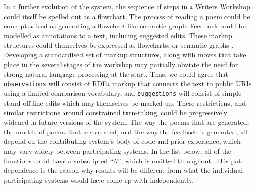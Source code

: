 In a further evolution of the system, the sequence of steps in a
Writers Workshop could itself be spelled out as a flowchart.  The
process of reading a poem could be conceptualised as generating a
flowchart-like semantic graph.  Feedback could be modelled as
annotations to a text, including suggested edits.  These markup
structures could themselves be expressed as flowcharts, or semantic
graphs \cite{harrington2007asknet,francisco2008ontology}.  Developing a standardised set of markup structures, along
with moves that take place in the several stages of the workshop may
partially obviate the need for strong natural language processing at
the start.  Thus, we could agree that {\tt observations} will consist
of RDFa markup that connects the text to public URIs using a limited
comparison vocabulary, and {\tt suggestions} will consist of simple
stand-off line-edits which may themselves be marked up.  These
restrictions, and similar restrictions around constrained turn-taking,
could be progressively widened in future versions of the system.
%
The way the poems that are generated, the models of poems that are
created, and the way the feedback is generated, all depend on the
contributing system's body of code and prior experience, which may
vary widely between participating systems.  In the list below, all of
the functions could have a subscripted ``$\mathcal{E}$'', which is
omitted throughout.  This path dependence is the reason why results
will be different from what the individual participating systems would
have come up with independently.

